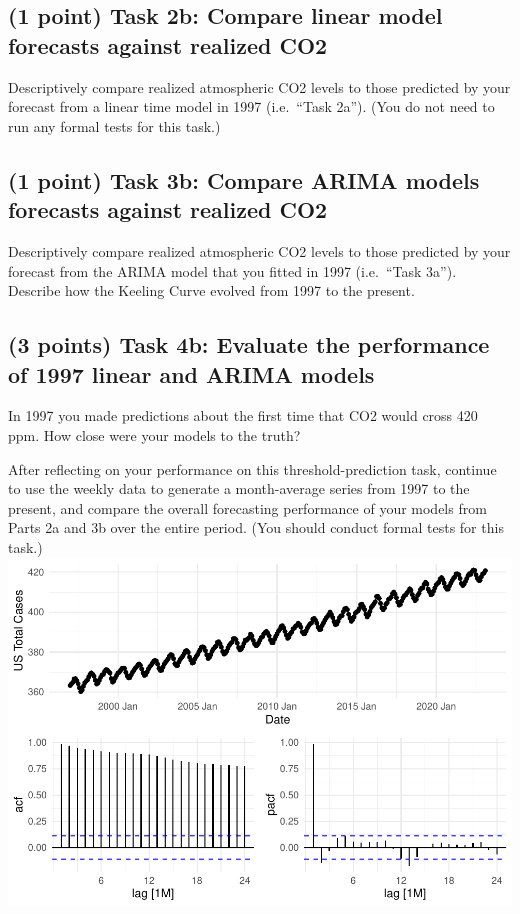 \documentclass[AER]{AEA}
\begin{document}
\hypertarget{point-task-2b-compare-linear-model-forecasts-against-realized-co2}{%
\subsection{(1 point) Task 2b: Compare linear model forecasts against
realized
CO2}\label{point-task-2b-compare-linear-model-forecasts-against-realized-co2}}

Descriptively compare realized atmospheric CO2 levels to those predicted
by your forecast from a linear time model in 1997 (i.e.~``Task 2a'').
(You do not need to run any formal tests for this task.)

\hypertarget{point-task-3b-compare-arima-models-forecasts-against-realized-co2}{%
\subsection{(1 point) Task 3b: Compare ARIMA models forecasts against
realized
CO2}\label{point-task-3b-compare-arima-models-forecasts-against-realized-co2}}

Descriptively compare realized atmospheric CO2 levels to those predicted
by your forecast from the ARIMA model that you fitted in 1997
(i.e.~``Task 3a''). Describe how the Keeling Curve evolved from 1997 to
the present.

\hypertarget{points-task-4b-evaluate-the-performance-of-1997-linear-and-arima-models}{%
\subsection{(3 points) Task 4b: Evaluate the performance of 1997 linear
and ARIMA
models}\label{points-task-4b-evaluate-the-performance-of-1997-linear-and-arima-models}}

In 1997 you made predictions about the first time that CO2 would cross
420 ppm. How close were your models to the truth?

After reflecting on your performance on this threshold-prediction task,
continue to use the weekly data to generate a month-average series from
1997 to the present, and compare the overall forecasting performance of
your models from Parts 2a and 3b over the entire period. (You should
conduct formal tests for this task.)
\includegraphics{Lab2_Group_report_files/figure-latex/unnamed-chunk-15-1.pdf}
\end{document}
